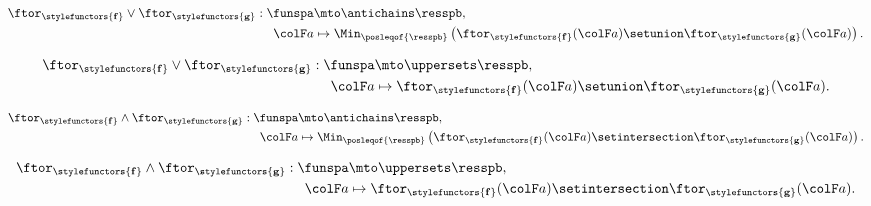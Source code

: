 \begin{forslides}
    \begin{equation}
        \label{eq:h_example_berk_cop}
        \begin{aligned}
            \ftor_{\stylefunctors{\mathbf{f}}}\vee\ftor_{\stylefunctors{\mathbf{g}}}:\funspa & \mto\antichains \resspb, \\
            \ensuremath{{\colF a}}\xspace                                                    & \mapsto\Min_{\posleqof{\resspb}}\left(\ftor_{\stylefunctors{\mathbf{f}}}(\ensuremath{{\colF a}}\xspace )\setunion\ftor_{\stylefunctors{\mathbf{g}}}(\ensuremath{{\colF a}}\xspace )\right).
        \end{aligned}
    \end{equation}

    \begin{equation}
        \label{eq:h_example_berk_cop_u}
        \begin{aligned}
            \ftor_{\stylefunctors{\mathbf{f}}}\vee\ftor_{\stylefunctors{\mathbf{g}}}:\funspa & \mto\uppersets \resspb, \\
            \ensuremath{{\colF a}}\xspace                                                    & \mapsto \ftor_{\stylefunctors{\mathbf{f}}}(\ensuremath{{\colF a}}\xspace )\setunion\ftor_{\stylefunctors{\mathbf{g}}}(\ensuremath{{\colF a}}\xspace ).
        \end{aligned}
    \end{equation}

    \begin{equation}
        \label{eq:h_example_berk_prod}
        \begin{aligned}
            \ftor_{\stylefunctors{\mathbf{f}}}\wedge\ftor_{\stylefunctors{\mathbf{g}}}:\funspa & \mto\antichains \resspb, \\
            \ensuremath{{\colF a}}\xspace                                                      & \mapsto\Min_{\posleqof{\resspb}}\left(\ftor_{\stylefunctors{\mathbf{f}}}(\ensuremath{{\colF a}}\xspace )\setintersection\ftor_{\stylefunctors{\mathbf{g}}}(\ensuremath{{\colF a}}\xspace )\right).
        \end{aligned}
    \end{equation}

    \begin{equation}
        \label{eq:h_example_berk_prod_u}
        \begin{aligned}
            \ftor_{\stylefunctors{\mathbf{f}}}\wedge\ftor_{\stylefunctors{\mathbf{g}}}:\funspa & \mto\uppersets \resspb, \\
            \ensuremath{{\colF a}}\xspace                                                      & \mapsto\ftor_{\stylefunctors{\mathbf{f}}}(\ensuremath{{\colF a}}\xspace )\setintersection\ftor_{\stylefunctors{\mathbf{g}}}(\ensuremath{{\colF a}}\xspace ).
        \end{aligned}
    \end{equation}


\end{forslides}
